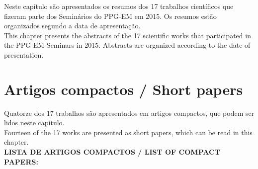 \documentclass[11pt,a4paper]{book} %
\newcommand{\Numpaperspt}{Quatorze }
\newcommand{\Numpapersen}{Fourteen }
\begin{document}
Neste capítulo são apresentados os resumos dos 17 trabalhos científicos
que fizeram parte dos Seminários do PPG-EM em 2015. Os resumos estão
organizados segundo a data de apresentação.\\

This chapter presents the abstracts of the 17 scientific works that
participated in the PPG-EM Seminars in 2015. Abstracts are organized
according to the date of presentation.\\





















\chapter{Artigos compactos / Short papers}

\hspace{-8mm}
\Numpaperspt dos 17 trabalhos são apresentados em artigos compactos, que podem ser lidos neste capítulo.\\

\hspace{-8mm}
\Numpapersen of the 17 works are presented as short papers, which can be read in this chapter.\\

\hspace{-8mm}
\textbf{LISTA DE ARTIGOS COMPACTOS / LIST OF COMPACT PAPERS:}\\
\end{document}
